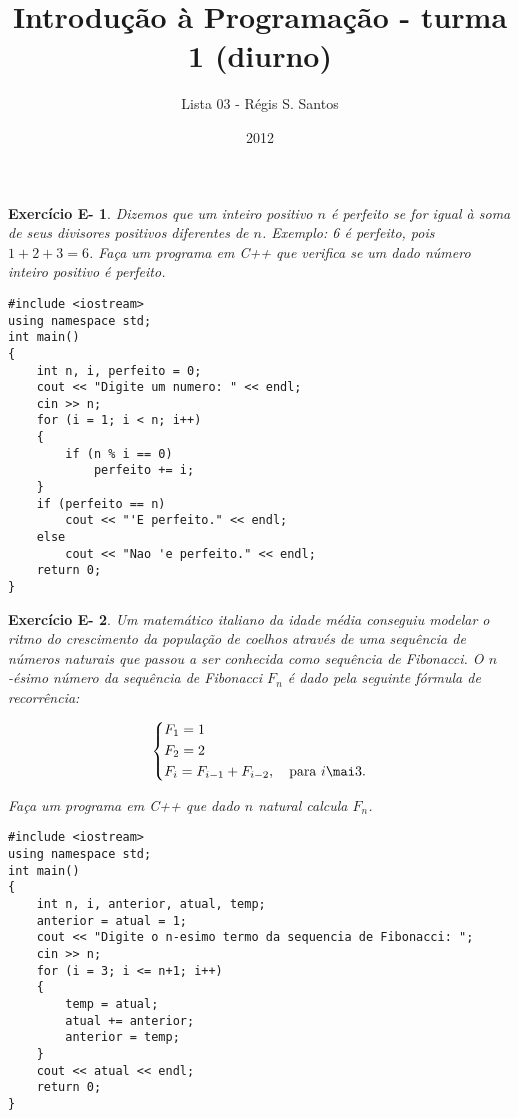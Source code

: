\documentclass[a4paper]{article}
\title{Introdução à Programação - turma 1 (diurno)}
\author{Lista 03 - R\'egis S. Santos}
\date{2012}
\newtheorem{eex}{Exerc\'icio E-}
\begin{document}
\maketitle

\setcounter{eex}{13}
\begin{eex}
Dizemos que um inteiro positivo $n$ é \emph{perfeito} se for igual à soma de seus divisores positivos diferentes de $n$. Exemplo: 6 é perfeito, pois $1 + 2 + 3 = 6$. Faça um programa em C++ que verifica se um dado número inteiro positivo é perfeito.
\end{eex}

\begin{sol}
\begin{lstlisting}
#include <iostream>
using namespace std;
int main()
{
    int n, i, perfeito = 0;
    cout << "Digite um numero: " << endl;
    cin >> n;
    for (i = 1; i < n; i++)
    {
        if (n % i == 0)
            perfeito += i;
    }
    if (perfeito == n)
        cout << "'E perfeito." << endl;
    else
        cout << "Nao 'e perfeito." << endl;
    return 0;
}
\end{lstlisting}
\end{sol}

\newpage 

\begin{eex}
Um matemático italiano da idade média conseguiu modelar o ritmo do crescimento da população de coelhos através de uma sequência de números naturais que passou a ser conhecida como \emph{sequência de Fibonacci}. O $n$-ésimo número da sequência de Fibonacci $F_n$ é dado pela seguinte fórmula de recorrência:

\[
\left\{ \begin{gathered}
  F_1  = 1 \hfill \\
  F_2  = 2 \hfill \\
  F_i  = F_{i - 1}  + F_{i - 2} , \quad \text{para } i \mai 3. \hfill \\ 
\end{gathered}  \right.
\]

Faça um programa em C++ que dado $n$ natural calcula $F_n$.
\end{eex}

\begin{sol}
\begin{lstlisting}
#include <iostream>
using namespace std;
int main()
{
    int n, i, anterior, atual, temp;
    anterior = atual = 1;
    cout << "Digite o n-esimo termo da sequencia de Fibonacci: ";
    cin >> n;
    for (i = 3; i <= n+1; i++)
    {
        temp = atual;
        atual += anterior;
        anterior = temp;
    }
    cout << atual << endl;
    return 0;
}
\end{lstlisting}
\end{sol}
\end{document}

